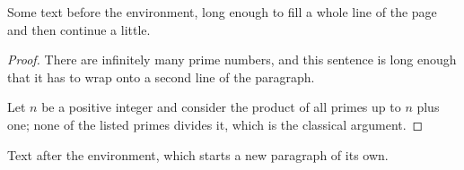\documentclass{article}
\begin{document}
Some text before the environment, long enough to fill a whole line of the page and then continue a little.
\begin{proof}
There are infinitely many prime numbers, and this sentence is long enough that it has to wrap onto a second line of the paragraph.

Let $n$ be a positive integer and consider the product of all primes up to $n$ plus one; none of the listed primes divides it, which is the classical argument.
\end{proof}
Text after the environment, which starts a new paragraph of its own.
\end{document}

